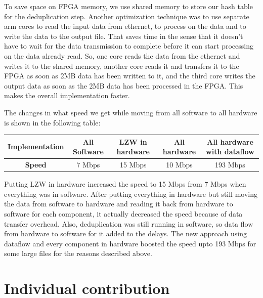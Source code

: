 \documentclass{article}
\begin{document}
To save space on FPGA memory, we use shared memory to store our hash table for the deduplication step.
Another optimization technique was to use separate arm cores to read the input data from ethernet, to process on the data and to write the data to the output file. 
\newline
That saves time in the sense that it doesn't have to wait for the data transmission to complete before it can start processing on the data already read. So, one core reads the data from the ethernet and writes it to the shared memory, another core reads it and transfers it to the FPGA as soon as 2MB data has been written to it, and the third core writes the output data as soon as the 2MB data has been processed in the FPGA. This makes the overall implementation faster. 
\newline\newline\newline

The changes in what speed we get while moving from all software to all hardware is shown in the following table:
\begin{center}
\begin{tabular}{ |c|c|c|c|c| } 
 \hline
 \textbf{Implementation}  & \textbf{All Software} & \textbf{LZW in hardware} & \textbf{All hardware} & \textbf{All hardware with dataflow} \\ 
 \hline
 \textbf{Speed}           & 7 Mbps      & 15 Mbps    & 10 Mbps      & 193 Mbps \\ 
 \hline
\end{tabular}
\end{center}

Putting LZW in hardware increased the speed to 15 Mbps from 7 Mbps when everything was in software. After putting everything in hardware but still moving the data from software to hardware and reading it back from hardware to software for each component, it actually decreased the speed because of data transfer overhead. Also, deduplication was still running in software, so data flow from hardware to software for it added to the delays. 
\newline
The new approach using dataflow and every component in hardware boosted the speed upto 193 Mbps for some large files for the reasons described above.


\section{Individual contribution}
\end{document}
